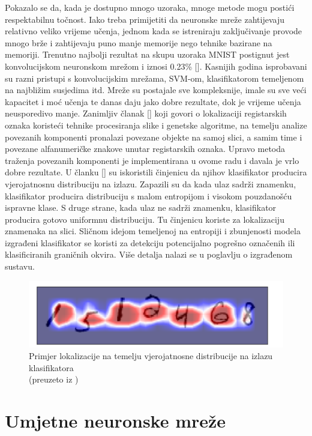 \documentclass[times, utf8, diplomski]{fer}
\theoremstyle{definition}
\begin{document}
Pokazalo se da, kada je dostupno mnogo uzoraka, mnoge metode mogu postići respektabilnu točnost. Iako treba primijetiti da neuronske mreže zahtijevaju relativno veliko vrijeme učenja, jednom kada se istreniraju zaključivanje provode mnogo brže i zahtijevaju puno manje memorije nego tehnike bazirane na memoriji. Trenutno najbolji rezultat na skupu uzoraka MNIST postignut jest konvolucijskom neuronskom mrežom i iznosi 0.23\% [\cite{6248110}]. Kasnijih godina isprobavani su razni pristupi s konvolucijskim mrežama, SVM-om, klasifikatorom temeljenom na najbližim susjedima itd. Mreže su postajale sve kompleksnije, imale su sve veći kapacitet i moć učenja te danas daju jako dobre rezultate, dok je vrijeme učenja neusporedivo manje. Zanimljiv članak [\cite{6490368}] koji govori o lokalizaciji registarskih oznaka koristeći tehnike procesiranja slike i genetske algoritme, na temelju analize povezanih komponenti pronalazi povezane objekte na samoj slici, a samim time i povezane alfanumeričke znakove unutar registarskih oznaka. Upravo metoda traženja povezanih komponenti je implementirana u ovome radu i davala je vrlo dobre rezultate. U članku [\cite{DL2018}] su iskoristili činjenicu da njihov klasifikator producira vjerojatnosnu distribuciju na izlazu. Zapazili su da kada ulaz sadrži znamenku, klasifikator producira distribuciju s malom entropijom i visokom pouzdanošću ispravne klase. S druge strane, kada ulaz ne sadrži znamenku, klasifikator producira gotovo uniformnu distribuciju. Tu činjenicu koriste za lokalizaciju znamenaka na slici. Sličnom idejom temeljenoj na entropiji i zbunjenosti modela izgrađeni klasifikator se koristi za detekciju potencijalno pogrešno označenih ili klasificiranih graničnih okvira. Više detalja nalazi se u poglavlju o izgrađenom sustavu.
\begin{figure}[h]
\centering
\includegraphics[scale=0.6]{localization_entropy.png}
\caption{Primjer lokalizacije na temelju vjerojatnosne distribucije na izlazu klasifikatora \\ (preuzeto iz \cite{DL2018})}
\end{figure}


\chapter{Umjetne neuronske mreže}
\end{document}
